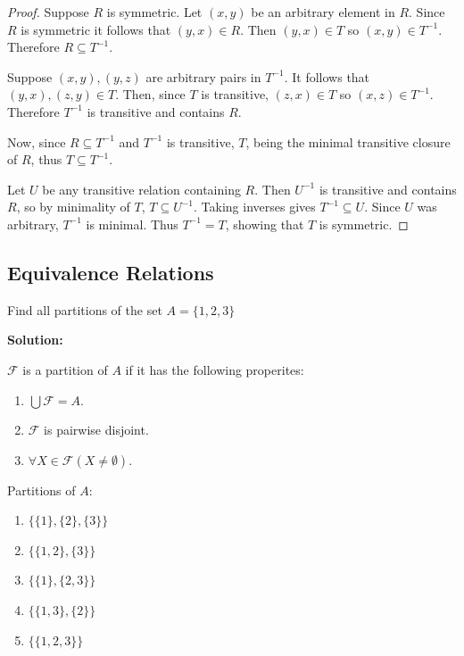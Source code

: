 \begin{proof}
    Suppose $R$ is symmetric. Let $(x, y)$ be an arbitrary element in $R$.
    Since $R$ is symmetric it follows that $(y, x) \in R$.
    Then $(y, x) \in T$ so $(x, y) \in T^{-1}$.
    Therefore $R \subseteq T^{-1}$.

    Suppose $(x, y), (y, z)$ are arbitrary pairs in $T^{-1}$.
    It follows that $(y, x), (z, y) \in T$.
    Then, since $T$ is transitive, $(z, x) \in T$ so $(x, z) \in T^{-1}$.
    Therefore $T^{-1}$ is transitive and contains $R$.

    Now, since $R \subseteq T^{-1}$ and $T^{-1}$ is transitive, 
    $T$, being the minimal transitive closure of $R$, thus $T \subseteq T^{-1}$.

    Let $U$ be any transitive relation containing $R$.
    Then $U^{-1}$ is transitive and contains $R$, so by minimality of $T$, $T \subseteq U^{-1}$.
    Taking inverses gives $T^{-1} \subseteq U$.
    Since $U$ was arbitrary, $T^{-1}$ is minimal.
    Thus $T^{-1} = T$, showing that $T$ is symmetric.
\end{proof}

\subsection{Equivalence Relations}

\begin{tcolorbox}[title=Problem 1, breakable]
    Find all partitions of the set $A = \{1, 2, 3\}$
\end{tcolorbox}

\textbf{Solution:}

$\mathcal{F}$ is a partition of $A$ if it has the following properites:
\begin{enumerate}
    \item $\bigcup \mathcal{F} = A$.
    \item $\mathcal{F}$ is pairwise disjoint.
    \item $\forall{X \in \mathcal{F}}(X \not = \emptyset)$.
\end{enumerate}

Partitions of $A$:
\begin{enumerate}
    \item $\{\{1\}, \{2\}, \{3\}\}$
    \item $\{\{1, 2\}, \{3\}\}$
    \item $\{\{1\}, \{2, 3\}\}$
    \item $\{\{1, 3\}, \{2\}\}$
    \item $\{\{1, 2, 3\}\}$
\end{enumerate}

